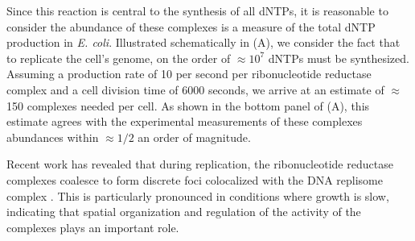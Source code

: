Since this reaction is central to the synthesis of all dNTPs, it is reasonable
to consider the abundance of these complexes is a measure of the total dNTP
production in \textit{E. coli}. Illustrated schematically in 
(A), we consider the fact that to replicate the cell's genome, on the order of
$\approx 10^7$ dNTPs must be synthesized. Assuming a production rate of 10 per
second per ribonucleotide reductase complex and a cell division time of 6000
seconds, we arrive at an estimate of $\approx$ 150 complexes needed per cell. As
shown in the bottom panel of  (A), this estimate agrees with
the experimental measurements of these complexes abundances within $\approx 1/2$
an order of magnitude.

Recent work has revealed that during replication, the ribonucleotide reductase
complexes coalesce to form discrete foci colocalized with the DNA replisome
complex \citep{sanchez-romero2011}. This is particularly pronounced in
conditions where growth is slow, indicating that spatial organization and
regulation of the activity of the complexes plays an important role.

\begin{figure}
    \begin{fullwidth}
\end{fullwidth}
\end{figure}



